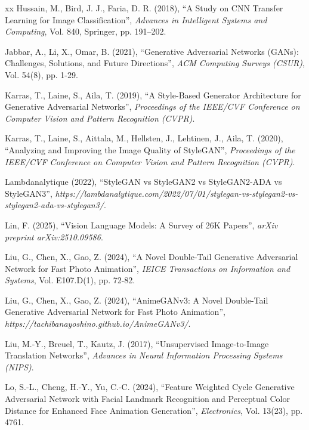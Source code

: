 \begin{thebibliography}{xx}
Hussain, M., Bird, J. J., Faria, D. R. (2018), ``A Study on CNN Transfer Learning for Image Classification'', {\em Advances in Intelligent Systems and Computing}, Vol. 840, Springer, pp. 191–202.

Jabbar, A., Li, X., Omar, B. (2021), ``Generative Adversarial Networks (GANs): Challenges, Solutions, and Future Directions'', {\em ACM Computing Surveys (CSUR)}, Vol. 54(8), pp. 1-29.

Karras, T., Laine, S., Aila, T. (2019), ``A Style-Based Generator Architecture for Generative Adversarial Networks'', {\em Proceedings of the IEEE/CVF Conference on Computer Vision and Pattern Recognition (CVPR)}.

Karras, T., Laine, S., Aittala, M., Hellsten, J., Lehtinen, J., Aila, T. (2020), ``Analyzing and Improving the Image Quality of StyleGAN'', {\em Proceedings of the IEEE/CVF Conference on Computer Vision and Pattern Recognition (CVPR)}.

Lambdanalytique (2022), ``StyleGAN vs StyleGAN2 vs StyleGAN2-ADA vs StyleGAN3'', {\em https://lambdanalytique.com/2022/07/01/stylegan-vs-stylegan2-vs-stylegan2-ada-vs-stylegan3/}.

Lin, F. (2025), ``Vision Language Models: A Survey of 26K Papers'', {\em arXiv preprint arXiv:2510.09586}.

Liu, G., Chen, X., Gao, Z. (2024), ``A Novel Double-Tail Generative Adversarial Network for Fast Photo Animation'', {\em IEICE Transactions on Information and Systems}, Vol. E107.D(1), pp. 72-82.

Liu, G., Chen, X., Gao, Z. (2024), ``AnimeGANv3: A Novel Double-Tail Generative Adversarial Network for Fast Photo Animation'', {\em https://tachibanayoshino.github.io/AnimeGANv3/}.

Liu, M.-Y., Breuel, T., Kautz, J. (2017), ``Unsupervised Image-to-Image Translation Networks'', {\em Advances in Neural Information Processing Systems (NIPS)}.

Lo, S.-L., Cheng, H.-Y., Yu, C.-C. (2024), ``Feature Weighted Cycle Generative Adversarial Network with Facial Landmark Recognition and Perceptual Color Distance for Enhanced Face Animation Generation'', {\em Electronics}, Vol. 13(23), pp. 4761.


\end{thebibliography}

